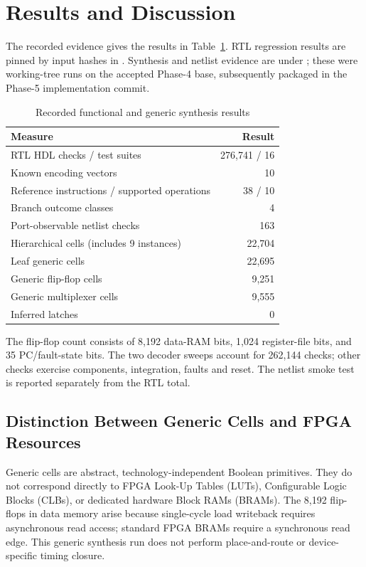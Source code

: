 \documentclass[conference,a4paper]{IEEEtran}
\begin{document}
\section{Results and Discussion}
The recorded evidence gives the results in Table~\ref{tab:results}.
RTL regression results are pinned by input hashes in
. Synthesis and netlist evidence
are under ; these were working-tree runs on the accepted
Phase-4 base, subsequently packaged in the Phase-5 implementation commit.

\begin{table}[t]
\caption{Recorded functional and generic synthesis results}
\label{tab:results}
\centering\small
\begin{tabular}{p{}r}
\toprule
Measure & Result\\\midrule
RTL HDL checks / test suites & 276,741 / 16\\
Known encoding vectors & 10\\
Reference instructions / supported operations & 38 / 10\\
Branch outcome classes & 4\\
Port-observable netlist checks & 163\\
Hierarchical cells (includes 9 instances) & 22,704\\
Leaf generic cells & 22,695\\
Generic flip-flop cells & 9,251\\
Generic multiplexer cells & 9,555\\
Inferred latches & 0\\\bottomrule
\end{tabular}
\end{table}

The flip-flop count consists of 8,192 data-RAM bits, 1,024 register-file bits,
and 35 PC/fault-state bits. The two decoder sweeps account for 262,144 checks;
other checks exercise components, integration, faults and reset. The netlist
smoke test is reported separately from the RTL total.

\subsection{Distinction Between Generic Cells and FPGA Resources}
Generic cells are abstract, technology-independent Boolean primitives. They do not correspond directly to FPGA Look-Up Tables (LUTs), Configurable Logic Blocks (CLBs), or dedicated hardware Block RAMs (BRAMs). The 8,192 flip-flops in data memory arise because single-cycle load writeback requires asynchronous read access; standard FPGA BRAMs require a synchronous read edge. This generic synthesis run does not perform place-and-route or device-specific timing closure.
\end{document}
